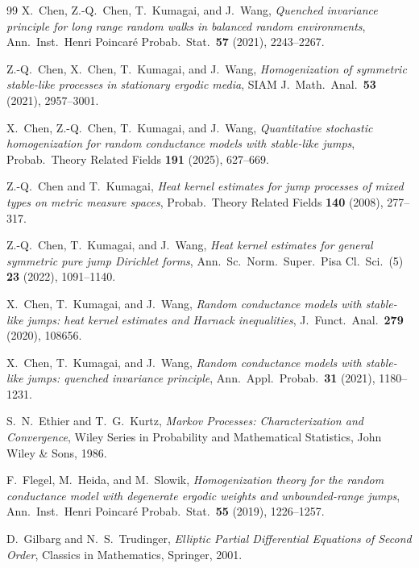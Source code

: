 \documentclass[11pt]{amsart}
\theoremstyle{plain}
\theoremstyle{definition}
\theoremstyle{remark}
\begin{document}
\begin{thebibliography}{99}
		X.~Chen, Z.-Q.~Chen, T.~Kumagai, and J.~Wang,
		\emph{Quenched invariance principle for long range random walks in balanced random environments},
		Ann.\ Inst.\ Henri Poincar\'e Probab.\ Stat.\ \textbf{57} (2021), 2243--2267.
		
		Z.-Q.~Chen, X.~Chen, T.~Kumagai, and J.~Wang,
		\emph{Homogenization of symmetric stable-like processes in stationary ergodic media},
		SIAM J.\ Math.\ Anal.\ \textbf{53} (2021), 2957--3001.
		
		X.~Chen, Z.-Q.~Chen, T.~Kumagai, and J.~Wang,
		\emph{Quantitative stochastic homogenization for random conductance models with stable-like jumps},
		Probab.\ Theory Related Fields \textbf{191} (2025), 627--669.
		
		Z.-Q.~Chen and T.~Kumagai,
		\emph{Heat kernel estimates for jump processes of mixed types on metric measure spaces},
		Probab.\ Theory Related Fields \textbf{140} (2008), 277--317.
		
		Z.-Q.~Chen, T.~Kumagai, and J.~Wang,
		\emph{Heat kernel estimates for general symmetric pure jump Dirichlet forms},
		Ann.\ Sc.\ Norm.\ Super.\ Pisa Cl.\ Sci.\ (5) \textbf{23} (2022), 1091--1140.
		
		X.~Chen, T.~Kumagai, and J.~Wang,
		\emph{Random conductance models with stable-like jumps: heat kernel estimates and Harnack inequalities},
		J.\ Funct.\ Anal.\ \textbf{279} (2020), 108656.
		
		X.~Chen, T.~Kumagai, and J.~Wang,
		\emph{Random conductance models with stable-like jumps: quenched invariance principle},
		Ann.\ Appl.\ Probab.\ \textbf{31} (2021), 1180--1231.
		
		S.~N.~Ethier and T.~G.~Kurtz,
		\emph{Markov Processes: Characterization and Convergence},
		Wiley Series in Probability and Mathematical Statistics, John Wiley \& Sons, 1986.
		
		F.~Flegel, M.~Heida, and M.~Slowik,
		\emph{Homogenization theory for the random conductance model with degenerate ergodic weights and unbounded-range jumps},
		Ann.\ Inst.\ Henri Poincar\'e Probab.\ Stat.\ \textbf{55} (2019), 1226--1257.
		
		D.~Gilbarg and N.~S.~Trudinger,
		\emph{Elliptic Partial Differential Equations of Second Order},
		Classics in Mathematics, Springer, 2001.
		

\end{thebibliography}
\end{document}
